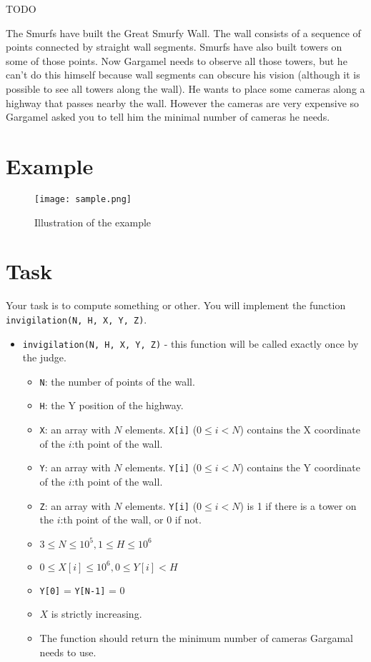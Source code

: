 \newcommand\version{v1}

TODO

The Smurfs have built the Great Smurfy Wall. The wall consists of a sequence of points connected by
straight wall segments. Smurfs have also built towers on some of those points. Now Gargamel needs
to observe all those towers, but he can’t do this himself because wall segments can obscure his vision
(although it is possible to see all towers along the wall). He wants to place some cameras along a highway
that passes nearby the wall. However the cameras are very expensive so Gargamel asked you to tell him
the minimal number of cameras he needs.

\section*{Example}
\begin{figure}[h!]
  \centering
  \texttt{[image: sample.png]}
  \caption{Illustration of the example}
\end{figure}

\section*{Task}
Your task is to compute something or other. You will implement the function \texttt{invigilation(N, H, X, Y, Z)}.

\begin{itemize}
  \item \texttt{invigilation(N, H, X, Y, Z)} - this function will be called exactly once by the judge.
  \begin{itemize}
    \item \texttt{N}: the number of points of the wall.
    \item \texttt{H}: the Y position of the highway.
    \item \texttt{X}: an array with $N$ elements. \texttt{X[i]} ($0 \le i < N$) contains the X coordinate of the $i$:th point of the wall.
    \item \texttt{Y}: an array with $N$ elements. \texttt{Y[i]} ($0 \le i < N$) contains the Y coordinate of the $i$:th point of the wall.
    \item \texttt{Z}: an array with $N$ elements. \texttt{Y[i]} ($0 \le i < N$) is 1 if there is a tower on the $i$:th point of the wall, or 0 if not.
    \item $3 \le N \le 10^5, 1 \le H \le 10^6$
    \item $0 \le X[i] \le 10^6, 0 \le Y[i] < H$
    \item \texttt{Y[0]} = \texttt{Y[N-1]} = 0
    \item $X$ is strictly increasing.
    \item The function should return the minimum number of cameras Gargamal needs to use.
  \end{itemize}
\end{itemize}

